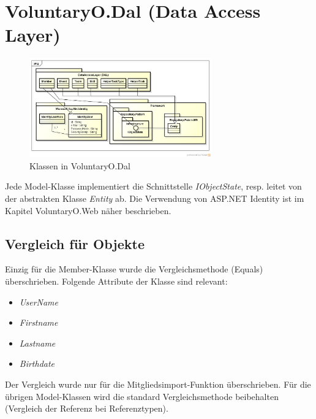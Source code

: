 \section{VoluntaryO.Dal (Data Access Layer)}
    \begin{figure}[h]
  		\vspace{-5pt}
    	\centering
    	\includegraphics[width=0.7\textwidth]{content/architekturdokumentation/images/VoluntaryO_Dal_Overview.png}
  		\vspace{-20pt}
    	\caption{Klassen in VoluntaryO.Dal}
	\end{figure}
	Jede Model-Klasse implementiert die Schnittstelle \textit{IObjectState}, resp. leitet von der abstrakten Klasse \textit{Entity} ab. Die Verwendung von ASP.NET Identity ist im Kapitel VoluntaryO.Web näher beschrieben.
	
	\subsection{Vergleich für Objekte}
		Einzig für die Member-Klasse wurde die Vergleichsmethode (Equals) überschrieben. Folgende Attribute der Klasse sind relevant:
		\\\begin{itemize}
			\item \textit{UserName}
			\item \textit{Firstname}
			\item \textit{Lastname}
			\item \textit{Birthdate}
		\end{itemize}
		Der Vergleich wurde nur für die Mitgliedsimport-Funktion überschrieben. Für die übrigen Model-Klassen wird die standard Vergleichsmethode beibehalten (Vergleich der Referenz bei Referenztypen).


